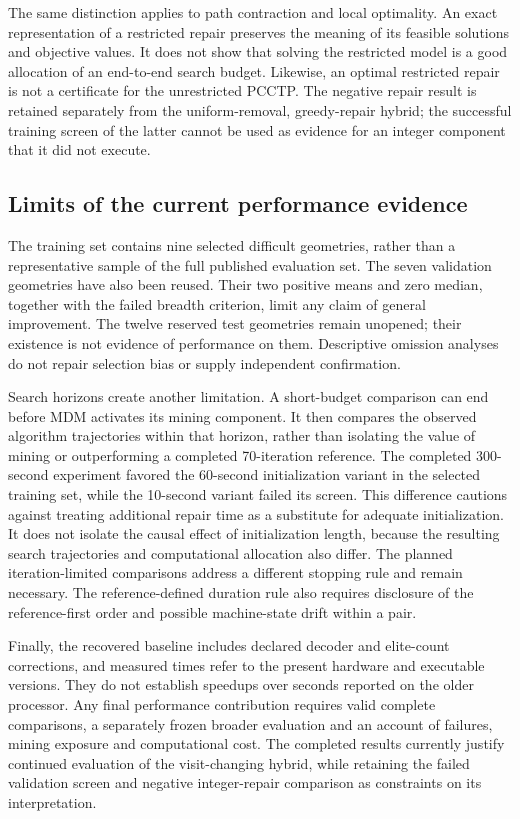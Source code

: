 The same distinction applies to path contraction and local optimality.
An exact representation of a restricted repair preserves the meaning of its
feasible solutions and objective values. It does not show that solving the
restricted model is a good allocation of an end-to-end search budget. Likewise,
an optimal restricted repair is not a certificate for the unrestricted PCCTP.
The negative repair result is retained separately from the uniform-removal,
greedy-repair hybrid; the successful training screen of the latter cannot be
used as evidence for an integer component that it did not execute.

\subsection{Limits of the current performance evidence}
The training set contains nine selected difficult geometries, rather than a
representative sample of the full published evaluation set. The seven
validation geometries have also been reused. Their two positive means and
zero median, together with the failed breadth criterion, limit any claim of
general improvement. The twelve reserved test geometries remain unopened;
their existence is not evidence of performance on them. Descriptive omission
analyses do not repair selection bias or supply independent confirmation.

Search horizons create another limitation. A short-budget comparison can end
before MDM activates its mining component. It then compares the observed
algorithm trajectories within that horizon, rather than isolating the value
of mining or outperforming a completed 70-iteration reference. The completed
300-second experiment favored the 60-second initialization variant in the
selected training set, while the 10-second variant failed its screen.
This difference cautions against treating additional repair time as a
substitute for adequate initialization. It does not isolate the causal
effect of initialization length, because the resulting search trajectories
and computational allocation also differ. The planned iteration-limited
comparisons address a different stopping rule and remain necessary.
The reference-defined duration
rule also requires disclosure of the reference-first order and possible
machine-state drift within a pair.

Finally, the recovered baseline includes declared decoder and elite-count
corrections, and measured times refer to the present hardware and executable
versions. They do not establish speedups over seconds reported on the older
processor. Any final performance contribution requires valid complete
comparisons, a separately frozen broader evaluation and an account of failures,
mining exposure and computational cost. The completed results currently justify
continued evaluation of the visit-changing hybrid, while retaining the failed
validation screen and negative integer-repair comparison as constraints on
its interpretation.
